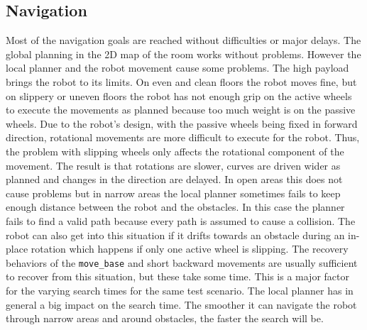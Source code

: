\subsection{Navigation} \label{NavEval}

Most of the navigation goals are reached without difficulties or major delays. The global planning in the 2D map of the room works without problems. However the local planner and the robot movement cause some problems. The high payload brings the robot to its limits. On even and clean floors the robot moves fine, but on slippery or uneven floors the robot has not enough grip on the active wheels to execute the movements as planned because too much weight is on the passive wheels. Due to the robot's design, with the passive wheels being fixed in forward direction, rotational movements are more difficult to execute for the robot. Thus, the problem with slipping wheels only affects the rotational component of the movement. The result is that rotations are slower, curves are driven wider as planned and changes in the direction are delayed. In open areas this does not cause problems but in narrow areas the local planner sometimes fails to keep enough distance between the robot and the obstacles. In this case the planner fails to find a valid path because every path is assumed to cause a collision. The robot can also get into this situation if it drifts towards an obstacle during an in-place rotation which happens if only one active wheel is slipping. The recovery behaviors of the \texttt{move{\_}base} and short backward movements are usually sufficient to recover from this situation, but these take some time. This is a major factor for the varying search times for the same test scenario. The local planner has in general a big impact on the search time. The smoother it can navigate the robot through narrow areas and around obstacles, the faster the search will be.